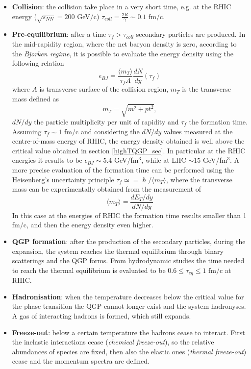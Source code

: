 \documentclass[b5paper,10pt,twoside,oldstyle,classica]{toptesi}
\begin{document}
\begin{itemize}
 \item \textbf{Collision}: the collision take place in a very short time, e.g. at the RHIC energy ($\sqrt{s_{NN}}=200$ GeV/c) $\tau_{coll} = \frac{2R}{\gamma} \sim 0.1$ fm/c.
 \item \textbf{Pre-equilibrium}: after a time $\tau_f > \tau_{coll}$ secondary particles are produced. In the mid-rapidity region, where the net baryon density is zero, according to the \textit{Bjorken regime}, it is possible to evaluate the energy density using the following relation
 \begin{equation}
 \label{bjorken_e}
 \epsilon_{BJ} = \frac{\langle m_T \rangle}{\tau_f A} \frac{dN}{dy}(\tau_f)
 \end{equation}
 where $A$ is transverse surface of the collision region, $m_T$ is the transverse mass defined as 
 \begin{equation}
  m_T = \sqrt{m^2+pt^2},
 \end{equation}
$dN/dy$ the particle multiplicity per unit of rapidity and $\tau_f$ the formation time. Assuming $\tau_f \sim 1$ fm/c and considering the $dN/dy$ values measured at the centre-of-mass energy of RHIC, the energy density obtained is well above the critical value obtained in section \ref{highTQGP_sec}. In particular at the RHIC energies it results to be $\epsilon_{BJ} \sim 5.4$ GeV/fm$^3$, while at LHC $\sim 15$ GeV/fm$^3$.
A more precise evaluation of the formation time can be performed using the Heisenberg's uncertainty principle $\tau_f \simeq = \hslash/\langle m_T \rangle$, where the transverse mass can be experimentally obtained from the measurement of 
 \begin{equation}
  \langle m_T \rangle = \frac{dE_T/dy}{dN/dy}
  \end{equation}
 In this case at the energies of RHIC the formation time results smaller than 1 fm/c, and then the energy density even higher. 
 \item \textbf{QGP formation}: after the production of the secondary particles, during the expansion, the system reaches the thermal equilibrium through binary scatterings and the QGP forms. From hydrodynamic studies the time needed to reach the thermal equilibrium is evaluated to be $0.6 \leq \tau_{eq} \leq 1$ fm/c at RHIC.     
 \item \textbf{Hadronisation}: when the temperature decreases below the critical value for the phase transition the QGP cannot longer exist and the system hadronyses. A gas of interacting hadrons is formed, which still expands.
 \item \textbf{Freeze-out}: below a certain temperature the hadrons cease to interact. First the inelastic interactions cease (\textit{chemical freeze-out}), so the relative abundances of species are fixed, then also the elastic ones (\textit{thermal freeze-out}) cease and the momentum spectra are defined.
\end{itemize}
\end{document}
